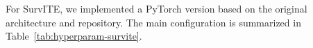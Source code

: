\documentclass{article} %
\newcommand{\rebuttal}[1]{\textcolor{black}{#1}}
\begin{document}
For SurvITE, we implemented a PyTorch version based on the original architecture and repository. The main configuration is summarized in Table~\ref{tab:hyperparam-survite}. %

\end{document}
